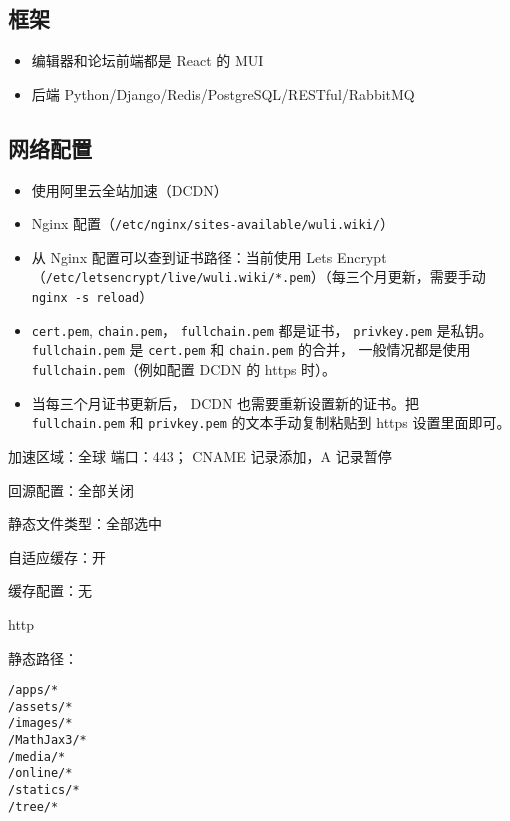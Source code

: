 \subsection{框架}
\begin{itemize}
\item 编辑器和论坛前端都是 React 的 MUI
\item 后端 Python/Django/Redis/PostgreSQL/RESTful/RabbitMQ
\end{itemize}

\subsection{网络配置}
\begin{itemize}
\item 使用阿里云全站加速（DCDN）
\item Nginx 配置（\verb`/etc/nginx/sites-available/wuli.wiki/`）
\item 从 Nginx 配置可以查到证书路径：当前使用 Lets Encrypt （\verb`/etc/letsencrypt/live/wuli.wiki/*.pem`）（每三个月更新，需要手动 \verb`nginx -s reload`）
\item \verb`cert.pem`, \verb`chain.pem`， \verb`fullchain.pem` 都是证书， \verb`privkey.pem` 是私钥。 \verb`fullchain.pem` 是 \verb`cert.pem` 和 \verb`chain.pem` 的合并， 一般情况都是使用 \verb`fullchain.pem`（例如配置 DCDN 的 https 时）。
\item 当每三个月证书更新后， DCDN 也需要重新设置新的证书。把 \verb`fullchain.pem` 和 \verb`privkey.pem` 的文本手动复制粘贴到 https 设置里面即可。
\end{itemize}

加速区域：全球 端口：443； CNAME 记录添加，A 记录暂停

回源配置：全部关闭

静态文件类型：全部选中

自适应缓存：开

缓存配置：无

http

静态路径：
\begin{lstlisting}[language=none]
/apps/*
/assets/*
/images/*
/MathJax3/*
/media/*
/online/*
/statics/*
/tree/*
\end{lstlisting}